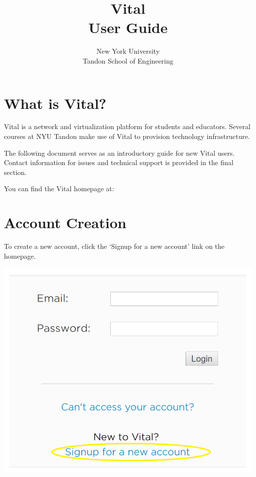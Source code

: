 \documentclass[12pt]{article}
\date{} %
\newcommand{\MYhref}[3][blue]{\href{#2}{\color{#1}{#3}}}%
\begin{document}

\title{\huge{\textbf{Vital}}\\\large{User Guide}}%
\author{New York University\\ %
Tandon School of Engineering} %
 
\maketitle

\section*{What is Vital?}
Vital is a network and virtualization platform for students and educators. Several courses at NYU Tandon make use of Vital to provision technology infrastructure.

The following document serves as an introductory guide for new Vital users. Contact information for issues and technical support is provided in the final section.

You can find the Vital homepage at: \MYhref{https://vital.engineering.nyu.edu/vital/login/}{https://vital.engineering.nyu.edu/vital/login/}

\section*{Account Creation}
To create a new account, click the `Signup for a new account’ link on the homepage.

{%
\centering
\includegraphics[scale=0.40]{account_creation.png}

}
\end{document}
